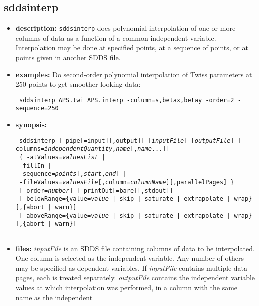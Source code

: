 \begin{latexonly}
\newpage
\end{latexonly}
\subsection{sddsinterp}
\label{sddsinterp}

\begin{itemize}
\item {\bf description:}
{\tt sddsinterp} does polynomial interpolation of one or more columns of data as
a function of a common independent variable.  Interpolation may be done at specified
points, at a sequence of points, or at points given in another SDDS file.  
\item {\bf examples:} 
Do second-order polynomial interpolation of Twiss parameters at 250 points
to get smoother-looking data:
\begin{flushleft}{\tt
sddsinterp APS.twi APS.interp -column=s,betax,betay -order=2 -sequence=250
}\end{flushleft}
\item {\bf synopsis:} 
\begin{flushleft}{\tt
sddsinterp [-pipe[=input][,output]] [{\em inputFile}] [{\em outputFile}] 
[-columns={\em independentQuantity},{\em name}[,{\em name}...]] \\ \ 
\{ -atValues={\em valuesList} | \\ \ 
-fillIn | \\ \
-sequence={\em points}[,{\em start},{\em end}] | \\ \ 
-fileValues={\em valuesFile}[,column={\em columnName}][,parallelPages] \}  \\ \ 
[-order={\em number}] [-printOut[=bare][,stdout]] \\ \ 
[-belowRange=\{value={\em value} | skip | saturate | extrapolate | wrap\}[,\{abort | warn\}] \\ \ 
[-aboveRange=\{value={\em value} | skip | saturate | extrapolate | wrap\}[,\{abort | warn\}] \\ \ 
}\end{flushleft}
\item {\bf files:}
{\em inputFile} is an SDDS file containing columns of data to be interpolated.
One column is selected as the independent variable.  Any number of others may
be specified as dependent variables. If {\em inputFile} contains multiple data pages,
each is treated separately.  {\em outputFile} contains the independent variable values
at which interpolation was performed, in a column with the same name as the independent

\end{itemize}
